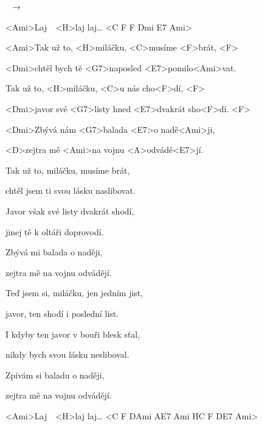 


\vskip 10pt

\x\ $\rightarrow$ \x

\vskip 10pt

<Ami>Laj\ \ <H\dim>laj laj… <C F F Dmi E7 Ami> 

\zs
<Ami>Tak už to, <H\dim>miláčku, <C>musíme <F>brát, <F>

<Dmi>chtěl bych tě <G7>naposled <E7>pomilo<Ami>vat.

Tak už to, <H\dim>miláčku, <C>u nás cho<F>dí, <F>

<Dmi>javor své <G7>listy hned <E7>dvakrát sho<F>dí. <F>

<Dmi>Zbývá nám <G7>balada <E7>o nadě<Ami>ji,

<D\dim>zejtra mě <Ami>na vojnu <A\dim>odvádě<E7>jí. 
\ks

\zs
Tak už to, miláčku, musíme brát,

chtěl jsem ti svou lásku naslibovat.

Javor však své listy dvakrát shodí,

jinej tě k oltáři doprovodí.

Zbývá mi balada o naději,

zejtra mě na vojnu odvádějí.
\ks

\zs
Teď jsem si, miláčku, jen jedním jist,

javor, ten shodí i poslední list.

I kdyby ten javor v bouři blesk sťal,

nikdy bych svou lásku nesliboval.

Zpívám si baladu o naději,

zejtra mě na vojnu odvádějí.
\ks

<Ami>Laj\ \ <H\dim>laj laj… <C F D\dim Ami A\dim E7 Ami H\dim C F D\dim E7 Ami> 

\kp
